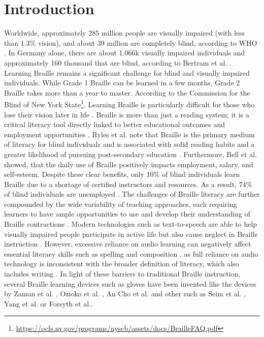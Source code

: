 \chapter{Introduction}
\label{ch:Introduction}

Worldwide, approximately 285 million people are visually impaired (with less than 1.3\% vision), and about 39 million are completely blind, according to WHO \cite{Pascolini2012}.
In Germany alone, there are about 1.066k visually impaired individuals and approximately 160 thousand that are blind, according to Bertram et al. \cite{Bertram2005}.
Learning Braille remains a significant challenge for blind and visually impaired individuals. While Grade 1 Braille can be learned in a few months, Grade 2 Braille takes more than a year to master. According to the Commission for the Blind of New York State\footnote{\url{https://ocfs.ny.gov/programs/nyscb/assets/docs/BrailleFAQ.pdf}}. Learning Braille is particularly difficult for those who lose their vision later in life \cite{Seim2014a}.
Braille is more than just a reading system; it is a critical literacy tool directly linked to better educational outcomes and employment opportunities \cite{Seim2014a, Ryles1996}. Ryles et al. note that Braille is the primary medium of literacy for blind individuals and is associated with solid reading habits and a greater likelihood of pursuing post-secondary education \cite{Ryles1996}. Furthermore, Bell et al. \cite{Bell2013} showed, that the daily use of Braille positively impacts employment, salary, and self-esteem.
Despite these clear benefits, only 10\% of blind individuals learn Braille due to a shortage of certified instructors and resources. As a result, 74\% of blind individuals are unemployed \cite{Seim2014a}.
The challenges of Braille literacy are further compounded by the wide variability of teaching approaches, each requiring learners to have ample opportunities to use and develop their understanding of Braille contractions \cite{Swenson1999}. Modern technologies such as text-to-speech are able to help visually impaired people participate in active life but also cause neglect in Braille instruction \cite{Seim2014a}. However, excessive reliance on audio learning can negatively affect essential literacy skills such as spelling and composition \cite{Foulke1979}, as full reliance on audio technology is inconsistent with the broader definition of literacy, which also includes writing \cite{tuttle1996point}.
In light of these barriers to traditional Braille instruction, several Braille learning devices such as gloves have been invented like the devices by Zaman et al. \cite{Zaman2019}, Ozioko et al. \cite{Ozioko2017}, An \cite{An2004} Cho et al. \cite{Cho2002} and other such as Seim et al. \cite{Seim2014a, Seim2014, Seim2015}, Yang et al. \cite{Yang2017} or Forsyth et al.\cite{Learning2024}.

